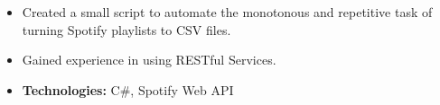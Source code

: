 \documentclass[10pt,letterpaper,ragged2e,academicons]{altacv}
\begin{document}
\begin{itemize}
  \item Created a small script to automate the monotonous and repetitive task of turning Spotify playlists to CSV files.
  \item Gained experience in using RESTful Services.
  \item \textbf{Technologies:} C\#, Spotify Web API
\end{itemize}
\divider\small

\clearpage
\nocite{*}
\end{document}
